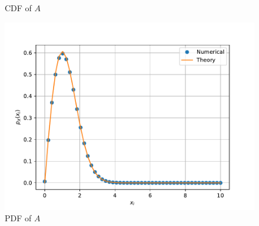 \documentclass[journal,10pt,twocolumn]{IEEEtran}
\begin{document}
\begin{enumerate}
\begin{figure}[H]
\caption{CDF of $A$}
\label{fig:rayleigh_cdf}
\end{figure}
\begin{figure}[H]
\centering
\includegraphics[width=\columnwidth]{./figs/chapter4/rayleigh_pdf.pdf}
\caption{PDF of $A$}
\label{fig:rayleigh_pdf}
\end{figure}
%


\end{enumerate}
\end{document}
